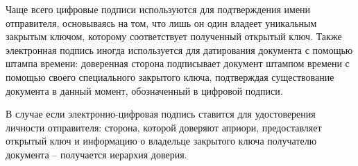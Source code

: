  Чаще всего цифровые подписи используются для подтверждения имени отправителя,
 основываясь на том, что лишь он один владеет уникальным закрытым ключом,
 которому соответствует полученный открытый ключ. Также электронная подпись
 иногда используется для датирования документа с помощью штампа времени:
 доверенная сторона подписывает документ штампом времени с помощью своего
 специального закрытого ключа, подтверждая существование документа в данный
 момент, обозначенный в цифровой подписи.
 
В случае если электронно-цифровая подпись ставится для удостоверения личности
отправителя: сторона, которой доверяют априори, предоставляет открытый ключ и
информацию о владельце закрытого ключа получателю документа -- получается
иерархия доверия.

